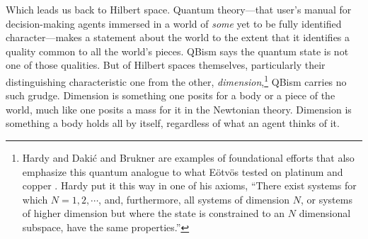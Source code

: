 \documentclass[aps,pra,superscriptaddress,10pt,tightenlines,twocolumn,nofootinbib]{revtex4}
\begin{document}
Which leads us back to Hilbert space.  Quantum theory---that user's manual for decision-making agents immersed in a world of {\it some\/} yet to be fully identified character---makes a statement about the world to the extent that it identifies a quality common to all the world's pieces.  QBism says the quantum state is not one of those qualities.  But of Hilbert spaces themselves, particularly their distinguishing characteristic one from the other, {\it dimension},\footnote{Hardy \cite{Hardy01a,Hardy01b} and Daki\'c and Brukner \cite{Dakic09} are examples of foundational efforts that also emphasize this quantum analogue to what E\"otv\"os tested on platinum and copper \cite{Fuchs04b}.  Hardy put it this way in one of his axioms, ``There exist systems for which $N = 1, 2, \cdots$, and, furthermore, all systems of dimension $N$, or systems of higher dimension but where the state is constrained to an $N$ dimensional subspace, have the same properties.''} QBism car\-ries no such grudge.  Dimension is something one posits for a body or a piece of the world, much like one posits a mass for it in the Newtonian theory.  Dimension is something a body holds all by itself, regardless of what an agent thinks of it.
\end{document}
